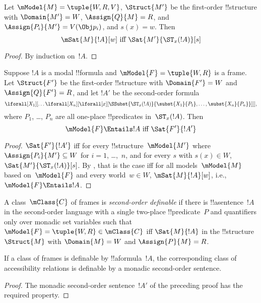 \documentclass[../../../include/open-logic-section]{subfiles}
\begin{document}
\begin{prop}
  Let $\mModel{M} = \tuple{W, R, V}$, $\Struct{M'}$ be the first-order
  !!{structure} with $\Domain{M'} = W$, $\Assign{Q}{M} = R$, and
  $\Assign{P_i}{M'} = V(\Obj p_i)$, and $s(x) = w$. Then
  \[
  \mSat{M}{!A}[w] \text{ iff } \Sat{M'}{\ST_x(!A)}[s]
  \]
\end{prop}

\begin{proof}
  By induction on~$!A$.
\end{proof}

\begin{prop}
  Suppose $!A$ is a modal !!{formula} and $\mModel{F} = \tuple{W, R}$
  is a frame. Let $\Struct{F'}$ be the first-order !!{structure} with
  $\Domain{F'} = W$ and $\Assign{Q}{F'} = R$, and let $!A'$ be the
  second-order formula
  \[
  \lforall[X_1][\dots\lforall[X_n][\lforall[x][
        \SSubst{\ST_x(!A)}{\subst{X_1}{P_1}, \dots,
          \subst{X_n}{P_n}}]]],
  \]
  where $P_1$, \dots, $P_n$ are all one-place !!{predicate}s
  in~$\ST_x(!A)$. Then
  \[
  \mModel{F} \Entails !A \text{ iff } \Sat{F'}{!A'}
  \]
\end{prop}

\begin{proof}
  $\Sat{F'}{!A'}$ iff for every !!{structure}~$\mModel{M'}$ where
  $\Assign{P_i}{M'} \subseteq W$ for $i = 1$, \dots,~$n$, and for
  every $s$ with $s(x) \in W$, $\Sat{M'}{\ST_x(!A)}[s]$. By
  , that is the case iff for all models~$\mModel{M}$
  based on~$\mModel{F}$ and every world~$w \in W$, $\mSat{M}{!A}[w]$,
  i.e., $\mModel{F} \Entails !A$.
\end{proof}

\begin{defn}
  A class~$\mClass{C}$ of frames is \emph{second-order definable} if
  there is !!a{sentence}~$!A$ in the second-order language with a
  single two-place !!{predicate}~$P$ and quantifiers only over monadic
  set variables such that $\mModel{F} = \tuple{W, R} \in \mClass{C}$
  iff $\Sat{M}{!A}$ in the !!{structure}~$\Struct{M}$ with
  $\Domain{M} = W$ and $\Assign{P}{M} = R$.
\end{defn}

\begin{cor}
  If a class of frames is definable by !!a{formula}~$!A$, the
  corresponding class of accessibility relations is definable by a
  monadic second-order sentence.
\end{cor}

\begin{proof}
  The monadic second-order sentence~$!A'$ of the preceding proof has
  the required property.
\end{proof}
\end{document}
